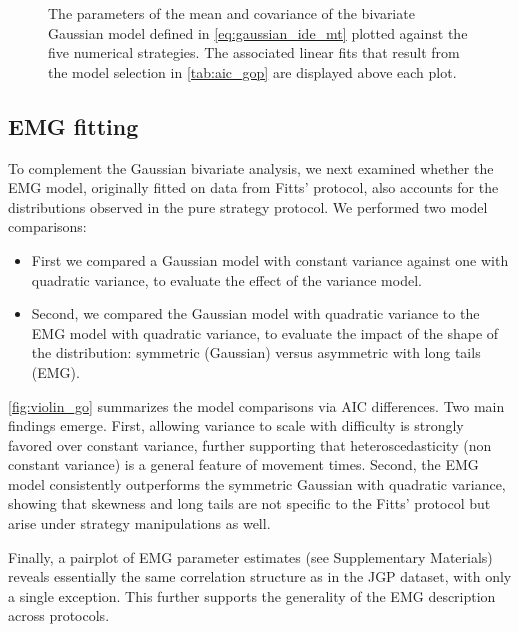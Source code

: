 \documentclass[acmlarge, manuscript,review]{acmart}
\begin{document}
\begin{figure}[htbp]
	\centering
	\caption{The parameters of the mean and covariance of the bivariate Gaussian model defined in \autoref{eq:gaussian_ide_mt} plotted against the five numerical strategies. The associated linear fits that result from the model selection in \autoref{tab:aic_gop} are displayed above each plot.}
	\label{fig:meancov_strat}

\end{figure}


\subsection{EMG fitting \label{sub:go:emg}}
To complement the Gaussian bivariate analysis, we next examined whether the EMG model, originally fitted on data from Fitts' protocol, also accounts for the distributions observed in the pure strategy protocol.
We performed two model comparisons: 
\begin{itemize}
	\item First we compared a Gaussian model with constant variance against one with quadratic variance, to evaluate the effect of the variance model.
	\item Second, we compared the Gaussian model with quadratic variance to the EMG model with quadratic variance, to evaluate the impact of the shape of the distribution: symmetric (Gaussian) versus asymmetric with long tails (EMG).
\end{itemize}

\autoref{fig:violin_go} summarizes the model comparisons via AIC differences. Two main findings emerge. First, allowing variance to scale with difficulty is strongly favored over constant variance, further supporting that heteroscedasticity (non constant variance) is a general feature of movement times. Second, the EMG model consistently outperforms the symmetric Gaussian with quadratic variance, showing that skewness and long tails are not specific to the Fitts' protocol but arise under strategy manipulations as well.

Finally, a pairplot of EMG parameter estimates (see Supplementary Materials) reveals essentially the same correlation structure as in the JGP dataset, with only a single exception. This further supports the generality of the EMG description across protocols.
\end{document}
